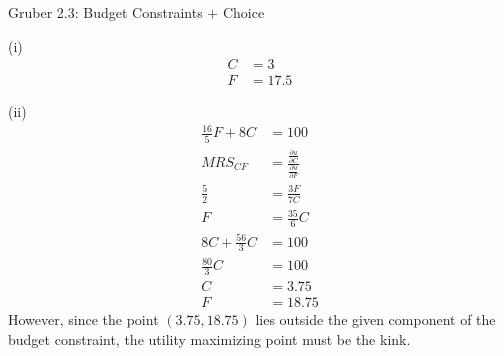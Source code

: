 \documentclass[10pt]{extarticle}
\begin{document}
\begin{problem}{Gruber 2.3: Budget Constraints $+$ Choice}
\begin{problem}{(i)}
\begin{align*}
        C &= 3\\
        F &= 17.5
      \end{align*}
    \end{problem}
    \begin{problem}{(ii)}
      \begin{align*}
        \frac{16}{5}F + 8C &= 100 \tag*{component of budget constraint}\\
        MRS_{CF} &= \frac{\frac{\partial u}{\partial C}}{\frac{\partial u}{\partial F}} \\
        \frac{5}{2}&= \frac{3F}{7C} \\
        F &= \frac{35}{6}C\\
        8C + \frac{56}{3}C &= 100\\
        \frac{80}{3}C &= 100\\
        C &= 3.75\\
        F &= 18.75
      \end{align*}
      However, since the point $(3.75,18.75)$ lies outside the given component of the budget constraint, the utility maximizing point must be the kink.
    \end{problem}
  \end{problem}
\end{document}
